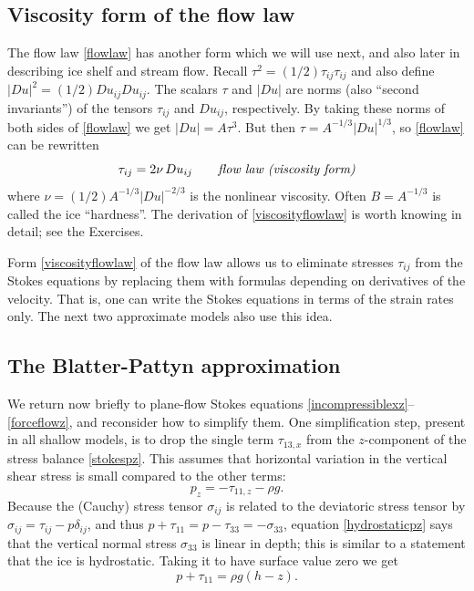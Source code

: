 \documentclass[letterpaper,final,12pt,reqno]{amsart}
\begin{document}
\subsection*{Viscosity form of the flow law}  The flow law \eqref{flowlaw} has another form which we will use next, and also later in describing ice shelf and stream flow.  Recall $\tau^2 = (1/2) \tau_{ij} \tau_{ij}$ and also define $|Du|^2 = (1/2) Du_{ij} Du_{ij}$.  The scalars $\tau$ and $|Du|$ are norms (also ``second invariants'') of the tensors $\tau_{ij}$ and $Du_{ij}$, respectively.  By taking these norms of both sides of \eqref{flowlaw} we get $|Du| = A \tau^3$.  But then $\tau = A^{-1/3} |Du|^{1/3}$, so \eqref{flowlaw} can be rewritten
\begin{equation}
\tau_{ij} = 2 \nu\, Du_{ij}  \qquad \text{\emph{flow law (viscosity form)}} \label{viscosityflowlaw}
\end{equation}
where $\nu = (1/2) A^{-1/3} |Du|^{-2/3}$ is the nonlinear viscosity.  Often $B = A^{-1/3}$ is called the ice ``hardness''.  The derivation of \eqref{viscosityflowlaw} is worth knowing in detail; see the Exercises.

Form \eqref{viscosityflowlaw} of the flow law allows us to eliminate stresses $\tau_{ij}$ from the Stokes equations by replacing them with formulas depending on derivatives of the velocity.  That is, one can write the Stokes equations in terms of the strain rates only.  The next two approximate models also use this idea.

\subsection*{The Blatter-Pattyn approximation}  We return now briefly to plane-flow Stokes equations \eqref{incompressiblexz}--\eqref{forceflowz}, and reconsider how to simplify them.  One simplification step, present in all shallow models, is to drop the single term  $\tau_{13,x}$ from the $z$-component of the stress balance \eqref{stokespz}.  This assumes that horizontal variation in the vertical shear stress is small compared to the other terms:
\begin{equation}
p_z = - \tau_{11,z} - \rho g. \label{hydrostaticpz}
\end{equation}
Because the (Cauchy) stress tensor $\sigma_{ij}$ is related to the deviatoric stress tensor by $\sigma_{ij} = \tau_{ij} - p \delta_{ij}$, and thus $p + \tau_{11} = p - \tau_{33} = - \sigma_{33}$, equation \eqref{hydrostaticpz} says that the vertical normal stress $\sigma_{33}$ is linear in depth; this is similar to a statement that the ice is hydrostatic.  Taking it to have surface value zero we get
\begin{equation}
p + \tau_{11} = \rho g (h-z). \label{hydrostaticitself}
\end{equation}
\end{document}
